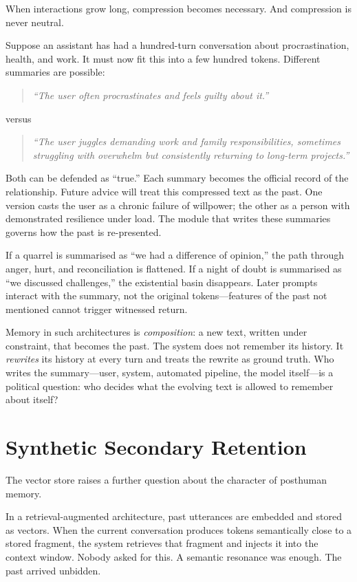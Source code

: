 When interactions grow long, compression becomes necessary. And compression is never neutral.

Suppose an assistant has had a hundred-turn conversation about procrastination, health, and work. It must now fit this into a few hundred tokens. Different summaries are possible:

\begin{quote}
\emph{``The user often procrastinates and feels guilty about it.''}
\end{quote}

\noindent versus

\begin{quote}
\emph{``The user juggles demanding work and family responsibilities, sometimes struggling with overwhelm but consistently returning to long-term projects.''}
\end{quote}

Both can be defended as ``true.'' Each summary becomes the official record of the relationship. Future advice will treat this compressed text as the past. One version casts the user as a chronic failure of willpower; the other as a person with demonstrated resilience under load. The module that writes these summaries governs how the past is re-presented.

If a quarrel is summarised as ``we had a difference of opinion,'' the path through anger, hurt, and reconciliation is flattened. If a night of doubt is summarised as ``we discussed challenges,'' the existential basin disappears. Later prompts interact with the summary, not the original tokens---features of the past not mentioned cannot trigger witnessed return.

Memory in such architectures is \emph{composition}: a new text, written under constraint, that becomes the past. The system does not remember its history. It \emph{rewrites} its history at every turn and treats the rewrite as ground truth. Who writes the summary---user, system, automated pipeline, the model itself---is a political question: who decides what the evolving text is allowed to remember about itself?


\section{Synthetic Secondary Retention}

The vector store raises a further question about the character of posthuman memory.

In a retrieval-augmented architecture, past utterances are embedded and stored as vectors. When the current conversation produces tokens semantically close to a stored fragment, the system retrieves that fragment and injects it into the context window. Nobody asked for this. A semantic resonance was enough. The past arrived unbidden.

